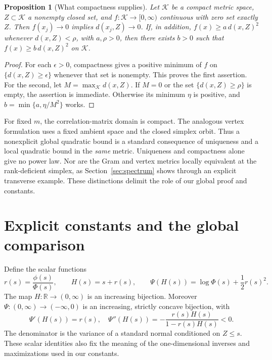 \documentclass[11pt]{article}
\newtheorem{proposition}[theorem]{Proposition}
\theoremstyle{remark}\newtheorem{remark}[theorem]{Remark}
\newcommand{\R}{\mathbb R}
\begin{document}
\begin{proposition}[What compactness supplies]\label{prop:compactness}
Let $\mathcal K$ be a compact metric space, $Z\subset\mathcal K$ a nonempty
closed set, and $f:\mathcal K\to[0,\infty)$ continuous with zero set exactly
$Z$. Then $f(x_j)\to0$ implies $d(x_j,Z)\to0$. If, in addition,
$f(x)\ge a\,d(x,Z)^2$ whenever $d(x,Z)<\rho$, with $a,\rho>0$,
then there exists $b>0$ such that $f(x)\ge b\,d(x,Z)^2$ on $\mathcal K$.
\end{proposition}
\begin{proof}
For each $\epsilon>0$, compactness gives a positive minimum of $f$ on
$\{d(x,Z)\ge\epsilon\}$ whenever that set is nonempty. This proves the
first assertion. For the second, let $M=\max_{\mathcal K}d(x,Z)$.
If $M=0$ or the set $\{d(x,Z)\ge\rho\}$ is empty, the assertion is
immediate. Otherwise its minimum $\eta$ is positive, and
$b=\min\{a,\eta/M^2\}$ works.
\end{proof}
For fixed $m$, the correlation-matrix domain is compact. The analogous
vertex formulation uses a fixed ambient space and the closed simplex orbit.
Thus a nonexplicit global quadratic bound is a standard consequence of
uniqueness and a local quadratic bound in the \emph{same} metric.
Uniqueness and compactness alone give no power law. Nor are the Gram and
vertex metrics locally equivalent at the rank-deficient simplex, as
Section~\ref{sec:spectrum} shows through an explicit transverse example.
These distinctions delimit the role of our global proof and constants.

\section{Explicit constants and the global comparison}
Define the scalar functions
\begin{equation}\label{eq:scalar}
 r(s)=\frac{\phi(s)}{\Phi(s)},\qquad H(s)=s+r(s),\qquad
 \Psi(H(s))=\log\Phi(s)+\frac12r(s)^2.
\end{equation}
The map $H:\R\to(0,\infty)$ is an increasing bijection.
Moreover $\Psi:(0,\infty)\to(-\infty,0)$ is an increasing, strictly concave
bijection, with
\begin{equation}\label{eq:psi-derivative}
 \Psi'(H(s))=r(s),\quad
 \Psi''(H(s))=-\frac{r(s)H(s)}{1-r(s)H(s)}<0.
\end{equation}
The denominator is the variance of a standard normal conditioned on $Z\le s$.
These scalar identities also fix the meaning of the one-dimensional inverses
and maximizations used in our constants.
\end{document}
